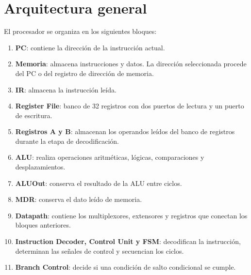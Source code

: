 \documentclass[11pt,a4paper]{article}
\begin{document}
\section{Arquitectura general}

El procesador se organiza en los siguientes bloques:
\begin{enumerate}
    \item \textbf{PC}: contiene la dirección de la instrucción actual.
    \item \textbf{Memoria}: almacena instrucciones y datos. La dirección seleccionada procede del PC o del registro de dirección de memoria.
    \item \textbf{IR}: almacena la instrucción leída.
    \item \textbf{Register File}: banco de 32 registros con dos puertos de lectura y un puerto de escritura.
    \item \textbf{Registros A y B}: almacenan los operandos leídos del banco de registros durante la etapa de decodificación.
    \item \textbf{ALU}: realiza operaciones aritméticas, lógicas, comparaciones y desplazamientos.
    \item \textbf{ALUOut}: conserva el resultado de la ALU entre ciclos.
    \item \textbf{MDR}: conserva el dato leído de memoria.
    \item \textbf{Datapath}: contiene los multiplexores, extensores y registros que conectan los bloques anteriores.
    \item \textbf{Instruction Decoder, Control Unit y FSM}: decodifican la instrucción, determinan las señales de control y secuencian los ciclos.
    \item \textbf{Branch Control}: decide si una condición de salto condicional se cumple.
\end{enumerate}
\end{document}
